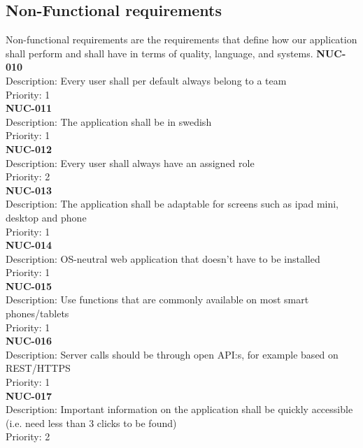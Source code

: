 \subsection{Non-Functional requirements}
Non-functional requirements are the requirements that define how our application shall perform and shall have in terms of quality, language, and systems.
\newline
\newline
\textbf{NUC-010} \\
Description: Every user shall per default always belong to a team \\
Priority: 1 \\
\newline
\textbf{NUC-011} \\
Description: The application shall be in swedish\\
Priority: 1 \\
\newline
\textbf{NUC-012} \\
Description: Every user shall always have an assigned role \\
Priority: 2 \\
\newline
\textbf{NUC-013} \\
Description: The application shall be adaptable for screens such as ipad mini, desktop and phone \\
Priority: 1 \\
\newline
\textbf{NUC-014} \\
Description: OS-neutral web application that doesn’t have to be installed\\
Priority: 1 \\
\newline
\textbf{NUC-015} \\
Description: Use functions that are commonly available on most smart phones/tablets\\
Priority: 1 \\
\newline
\textbf{NUC-016} \\
Description: Server calls should be through open API:s, for example based on REST/HTTPS \\
Priority: 1 \\
\newline
\textbf{NUC-017} \\
Description: Important information on the application shall be quickly accessible (i.e. need less than 3 clicks to be found)  \\
Priority: 2 \\
\newline

